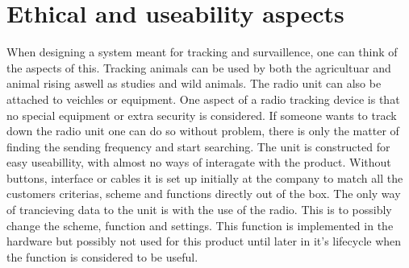 \begin{comment}
In some cases the component needs to be initialized in a specific way or it needs some other special attention which might require additional connections than it firstly seemed.
With all the specified components connected together a program is made to show all the functions and that they work as intended. 
To ensure that each component on the \gls{pcb} works and the prototype can be handed over to the software developers for a more advanced and optimized program. 
\end{comment}

\section{Ethical and useability aspects}
When designing a system meant for tracking and survaillence, one can think of the aspects of this. Tracking animals can be used by both the agricultuar and animal rising aswell as studies and wild animals. The radio unit can also be attached to veichles or equipment. One aspect of a radio tracking device is that no special equipment or extra security is considered. If someone wants to track down the radio unit one can do so without problem, there is only the matter of finding the sending frequency and start searching.   
The unit is constructed for easy useabillity, with almost no ways of interagate with the product. Without buttons, interface or cables it is set up initially at the company to match all the customers criterias, scheme and functions directly out of the box. The only way of trancieving data to the unit is with the use of the radio. This is to possibly change the scheme, function and settings. This function is implemented in the hardware but possibly not used for this product until later in it's lifecycle when the function is considered to be useful. 



